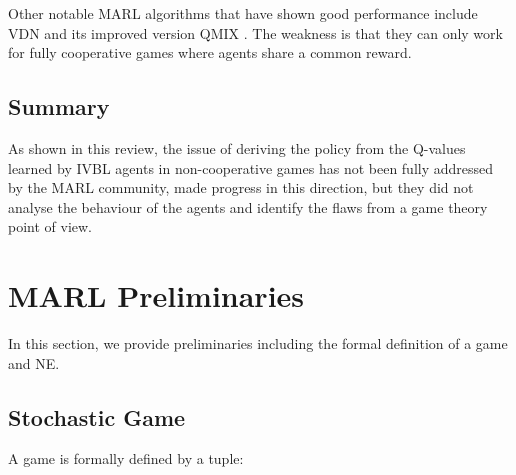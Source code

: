 \documentclass[]{interact}
\theoremstyle{plain}%
\theoremstyle{definition}
\theoremstyle{remark}
\begin{document}
Other notable MARL algorithms that have shown good performance include VDN \cite{sunehag2017value} and its improved version QMIX \cite{rashid2020monotonic}. The weakness is that they can only work for fully cooperative games where agents share a common reward.

\subsection{Summary}
As shown in this review, the issue of deriving the policy from the Q-values learned by IVBL agents in non-cooperative games has not been fully addressed by the MARL community, \cite{bjornsson2009cadiaplayer, jiang2018q, kopacz2023evaluating, qu2020distributed} made progress in this direction, but they did not analyse the behaviour of the agents and identify the flaws from a game theory point of view.

\section{MARL Preliminaries}
In this section, we provide preliminaries including the formal definition of a game and NE.

\subsection{Stochastic Game}
A game is formally defined by a tuple:
\end{document}
